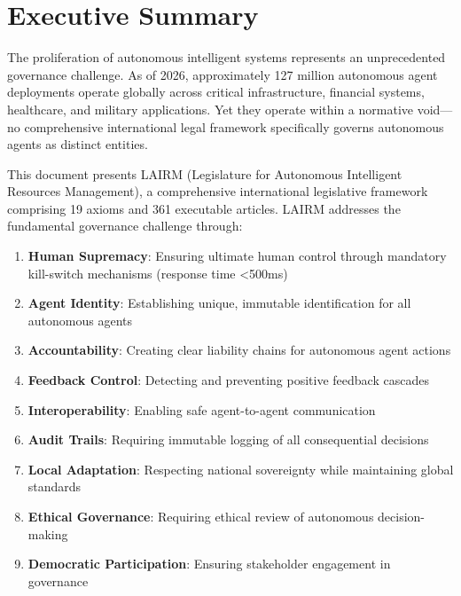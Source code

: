 \documentclass[12pt,a4paper,twoside,openright]{book}
\begin{document}
\cleardoublepage





\chapter*{Executive Summary}

The proliferation of autonomous intelligent systems represents an unprecedented governance challenge. As of 2026, approximately 127 million autonomous agent deployments operate globally across critical infrastructure, financial systems, healthcare, and military applications. Yet they operate within a normative void—no comprehensive international legal framework specifically governs autonomous agents as distinct entities.

This document presents LAIRM (Legislature for Autonomous Intelligent Resources Management), a comprehensive international legislative framework comprising 19 axioms and 361 executable articles. LAIRM addresses the fundamental governance challenge through:

\begin{enumerate}
    \item \textbf{Human Supremacy}: Ensuring ultimate human control through mandatory kill-switch mechanisms (response time <500ms)
    \item \textbf{Agent Identity}: Establishing unique, immutable identification for all autonomous agents
    \item \textbf{Accountability}: Creating clear liability chains for autonomous agent actions
    \item \textbf{Feedback Control}: Detecting and preventing positive feedback cascades
    \item \textbf{Interoperability}: Enabling safe agent-to-agent communication
    \item \textbf{Audit Trails}: Requiring immutable logging of all consequential decisions
    \item \textbf{Local Adaptation}: Respecting national sovereignty while maintaining global standards
    \item \textbf{Ethical Governance}: Requiring ethical review of autonomous decision-making
    \item \textbf{Democratic Participation}: Ensuring stakeholder engagement in governance
\end{enumerate}
\end{document}

